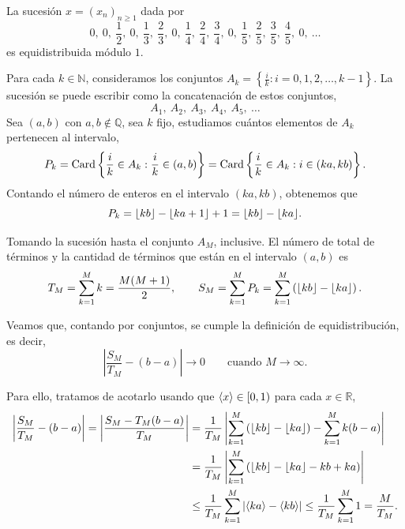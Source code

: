 \begin{example}
    La sucesión $x=(x_n)_{n\geq1}$ dada por
    \[
        0, \ 
        0, \ \frac{1}{2}, \ 
        0, \ \frac{1}{3}, \ \frac{2}{3}, \ 
        0, \ \frac{1}{4}, \ \frac{2}{4}, \ \frac{3}{4}, \ 
        0, \ \frac{1}{5}, \ \frac{2}{5}, \ \frac{3}{5}, \ \frac{4}{5}, \ 
        0, \ \dots 
    \]
    es equidistribuida módulo $1$.
\end{example}

\begin{resolve}
    Para cada $k \in \mathbb{N}$, consideramos los conjuntos $A_k = \left\{\frac{i}{k} : i = 0, 1, 2, \dots, k-1 \right\}$.
    La sucesión se puede escribir como la concatenación de estos conjuntos,
    \[
        A_1, \ A_2, \ A_3, \ A_4, \ A_5, \ \dots
    \]
    Sea $(a,b)$ con $a,b \notin \mathbb{Q}$, sea $k$ fijo, estudiamos cuántos elementos de $A_k$ pertenecen al intervalo,
    \[
        P_k = 
        \operatorname{Card} \left\{ \frac{i}{k} \in A_k : \frac{i}{k} \in (a,b) \right\} =
        \operatorname{Card} \left\{ \frac{i}{k} \in A_k : i \in (ka,kb)\right\}.
    \]
    Contando el número de enteros en el intervalo $(ka,kb)$, obtenemos que 
    \[
        P_k = \lfloor kb \rfloor - \lfloor ka+1 \rfloor + 1 = \lfloor kb \rfloor - \lfloor ka \rfloor.
    \]

    Tomando la sucesión hasta el conjunto $A_M$, inclusive. El número de total de términos y la cantidad
    de términos que están en el intervalo $(a,b)$ es
    \[
        T_M = \sum_{k=1}^M k = \frac{M(M+1)}{2}, \qquad 
        S_M = \sum_{k=1}^M P_k = \sum_{k=1}^M \left(\lfloor kb \rfloor - \lfloor ka \rfloor\right).
    \]

    Veamos que, contando por conjuntos, se cumple la definición de equidistribución, es decir,
    \[
        \left|\frac{S_M}{T_M} - (b-a)\right| \longrightarrow 0 \qquad \text{cuando } M \to \infty.
    \]

    Para ello, tratamos de acotarlo usando que $\langle x \rangle \in [0,1)$ para cada $x \in \mathbb{R}$,
    \begin{align*}
        \left| \frac{S_M}{T_M} - (b-a) \right| 
        =\left| \frac{S_M - T_M(b-a)}{T_M} \right| 
        &=\frac{1}{T_M}\left| \sum_{k=1}^M \left(\lfloor kb \rfloor - \lfloor ka \rfloor\right) - \sum_{k=1}^M k(b-a) \right| \\ 
        &=\frac{1}{T_M}\left| \sum_{k=1}^M \left(\lfloor kb \rfloor - \lfloor ka \rfloor - kb + ka\right) \right| \\
        &\leq\frac{1}{T_M} \sum_{k=1}^M \left|\langle ka \rangle - \langle kb \rangle\right| 
        \leq\frac{1}{T_M} \sum_{k=1}^M 1 = \frac{M}{T_M}.
    \end{align*}
    

\end{resolve}
